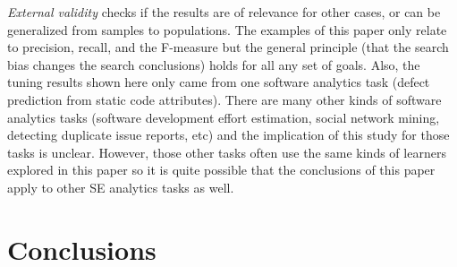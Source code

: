 \documentclass{sig-alternative}
\begin{document}
{\em External validity} checks if the results are of relevance
for other cases, or can be generalized from samples
to populations.  
The examples of this paper  only relate to precision, recall, and the F-measure
but the general principle (that the search bias changes the search conclusions)  holds for all any set of goals. 
Also,
the tuning results shown here only came from one  software analytics task 
(defect prediction from static code attributes).
There are many other kinds of software analytics tasks 
(software development effort estimation, social network mining,
detecting duplicate issue reports, etc) and the implication of this
study for those tasks is unclear. 
However,  those other tasks often use the same kinds of learners
explored in this paper so it is quite possible that
the conclusions of this paper apply to other SE analytics tasks as well. 





\section{Conclusions}
\end{document}
